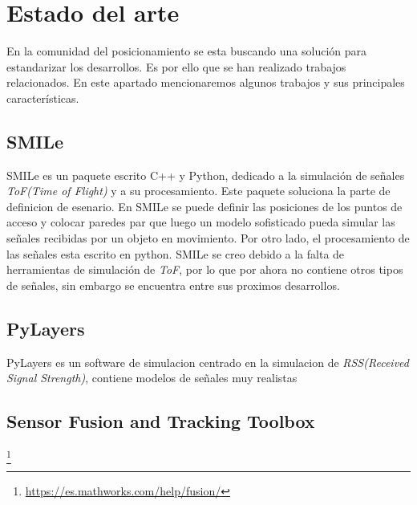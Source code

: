 \section{Estado del arte}
En la comunidad del posicionamiento se esta buscando una solución para estandarizar los desarrollos. Es por ello que se han realizado trabajos relacionados. En este apartado mencionaremos algunos trabajos y sus principales características.
\subsection{SMILe}
SMILe\cite{Jankowski2018} es un paquete escrito C++ y Python, dedicado a la simulación de señales \emph{ToF(Time of Flight)} y a su procesamiento. Este paquete soluciona la parte de definicion de esenario. En SMILe se puede definir las posiciones de los puntos de acceso y colocar paredes par que luego un modelo sofisticado pueda simular las señales recibidas por un objeto en movimiento. Por otro lado, el procesamiento de las señales esta escrito en python. SMILe se creo debido a la falta de herramientas de simulación de \emph{ToF}, por lo que por ahora no contiene otros tipos de señales, sin embargo se encuentra entre sus proximos desarrollos.  
\subsection{PyLayers}
PyLayers\cite{Amiot2013} es un software de simulacion centrado en la simulacion de \emph{RSS(Received Signal Strength)}, contiene modelos de señales muy realistas 
\subsection{Sensor Fusion and Tracking Toolbox}
\footnote{\url{https://es.mathworks.com/help/fusion/}}